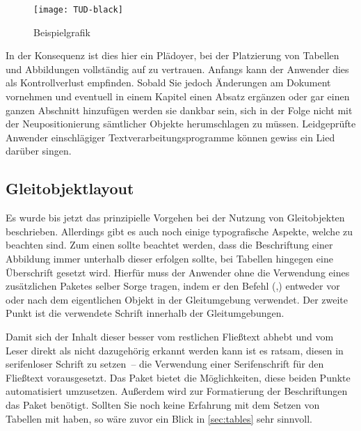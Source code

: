 \documentclass[%
  english,ngerman,%
  cdgeometry=no,DIV=12,automark%
]{tudscrartcl}
\begin{document}
\begin{Trunk}
\begin{figure}
\centering
\texttt{[image: TUD-black]}
\caption{Beispielgrafik}\label{fig:example}
\end{figure}

\end{Trunk}
\InputCode\noindent
%
In der Konsequenz ist dies hier ein Plädoyer, bei der Platzierung von Tabellen 
und Abbildungen vollständig auf  zu vertrauen. Anfangs kann der 
Anwender dies als Kontrollverlust empfinden. Sobald Sie jedoch Änderungen am 
Dokument vornehmen und eventuell in einem Kapitel einen Absatz ergänzen oder 
gar einen ganzen Abschnitt hinzufügen werden sie dankbar sein, sich in der 
Folge nicht mit der Neupositionierung sämtlicher Objekte herumschlagen zu 
müssen. Leidgeprüfte Anwender einschlägiger Textverarbeitungsprogramme können 
gewiss ein Lied darüber singen.



\subsection{Gleitobjektlayout}
\label{sec:floatlayout}%
%
Es wurde bis jetzt das prinzipielle Vorgehen bei der Nutzung von Gleitobjekten 
beschrieben. Allerdings gibt es auch noch einige typografische Aspekte, welche 
zu beachten sind. Zum einen sollte beachtet werden, dass die Beschriftung einer 
Abbildung immer unterhalb dieser erfolgen sollte, bei Tabellen hingegen eine 
Überschrift gesetzt wird. Hierfür muss der Anwender ohne die Verwendung eines 
zusätzlichen Paketes selber Sorge tragen, indem er den Befehl 
(,) entweder vor oder 
nach dem eigentlichen Objekt in der Gleitumgebung verwendet. Der zweite Punkt 
ist die verwendete Schrift innerhalb der Gleitumgebungen. 

Damit sich der Inhalt dieser besser vom restlichen Fließtext abhebt und vom 
Leser direkt als nicht dazugehörig erkannt werden kann ist es ratsam, diesen in 
serifenloser Schrift zu setzen~-- die Verwendung einer Serifenschrift für den 
Fließtext vorausgesetzt. Das Paket  bietet die Möglichkeiten, 
diese beiden Punkte automatisiert umzusetzen. Außerdem wird zur Formatierung 
der Beschriftungen das Paket  benötigt. Sollten Sie noch keine 
Erfahrung mit dem Setzen von Tabellen mit  haben, so wäre zuvor 
ein Blick in \autoref{sec:tables} sehr sinnvoll. 
\end{document}
